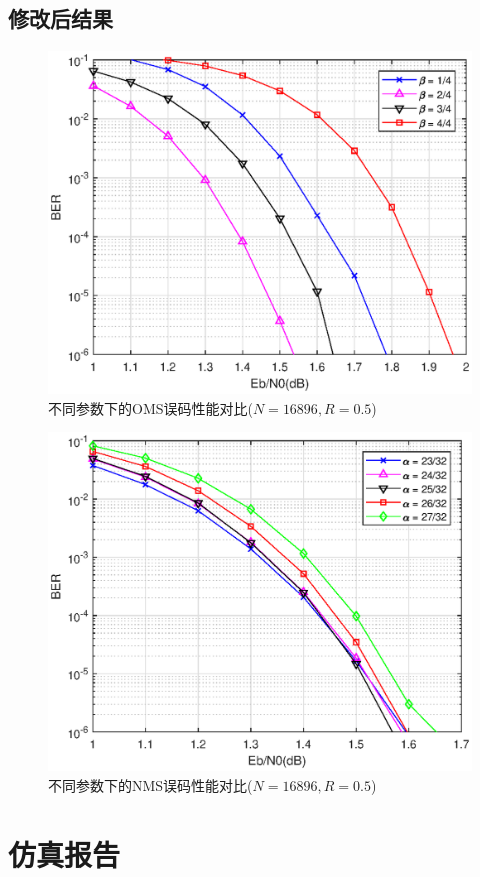 \documentclass{article}
\begin{document}
\subsection{修改后结果}
\begin{figure}[H]
	\centering
	\includegraphics[width = .8\textwidth]{oms.eps}
	\caption{不同参数下的OMS误码性能对比($N=16896, R=0.5$)}
\end{figure}
\begin{figure}[H]
	\centering
	\includegraphics[width = .8\textwidth]{nms.eps}
	\caption{不同参数下的NMS误码性能对比($N=16896, R=0.5$)}
\end{figure}

\section{仿真报告}





\end{document}
